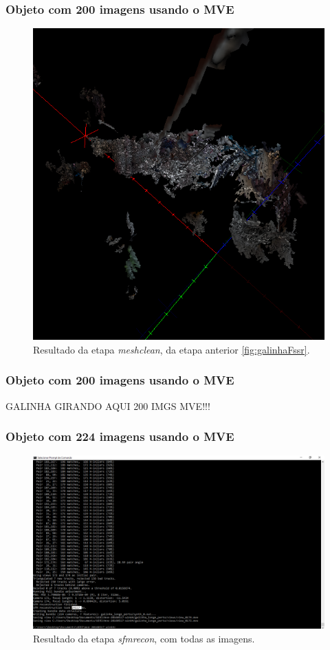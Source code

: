 \documentclass[table, usenames, svgnames, xcolor=dvipsnames]{beamer}
\begin{document}
\begin{frame}
\frametitle{\textbf{Objeto com 200 imagens usando o MVE}}
	\begin{figure}[!h]
		\centering
		\includegraphics[width=0.5\linewidth]{figs/galinhameshclean.png}
		\caption{%
		Resultado da etapa \protect\emph{meshclean}, da etapa anterior \ref{fig:galinhaFssr}.
		}
	\end{figure}
\end{frame}

\begin{frame}
\frametitle{\textbf{Objeto com 200 imagens usando o MVE}}
	GALINHA GIRANDO AQUI 200 IMGS MVE!!!
\end{frame}

\begin{frame}
\frametitle{\textbf{Objeto com 224 imagens usando o MVE}}
	\begin{figure}[!h]
		\centering
		\includegraphics[width=0.8\linewidth]{figs/mvesfmrecongalinhapertolonge.png}
		\caption{%
		Resultado da etapa \protect\emph{sfmrecon}, com todas as imagens.
		}
	\end{figure}
\end{frame}
\end{document}
